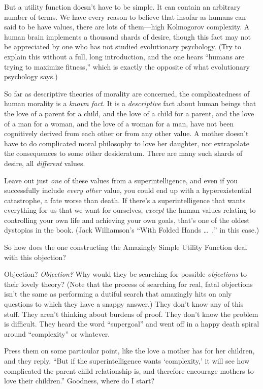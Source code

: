 {
 But a utility function doesn't have to be simple.
It can contain an arbitrary number of terms. We have every reason to
believe that insofar as humans can said to be have values, there are
lots of them---high Kolmogorov complexity. A human brain implements a
thousand shards of desire, though this fact may not be appreciated by
one who has not studied evolutionary psychology. (Try to explain this
without a full, long introduction, and the one hears
``humans are trying to maximize
fitness,'' which is exactly the opposite of what
evolutionary psychology says.)}

{
 So far as descriptive theories of morality are concerned, the
complicatedness of human morality is a \textit{known fact}. It is a
\textit{descriptive} fact about human beings that the love of a parent
for a child, and the love of a child for a parent, and the love of a
man for a woman, and the love of a woman for a man, have not been
cognitively derived from each other or from any other value. A mother
doesn't have to do complicated moral philosophy to love
her daughter, nor extrapolate the consequences to some other
desideratum. There are many such shards of desire, all
\textit{different} values.}

{
 Leave out just \textit{one} of these values from a
superintelligence, and even if you successfully include \textit{every
other} value, you could end up with a hyperexistential catastrophe, a
fate worse than death. If there's a superintelligence
that wants everything for us that we want for ourselves,
\textit{except} the human values relating to controlling your own life
and achieving your own goals, that's one of the oldest
dystopias in the book. (Jack Williamson's
``With Folded Hands \ldots~,'' in
this case.)}

{
 So how does the one constructing the Amazingly Simple Utility
Function deal with this objection?}

{
 Objection? \textit{Objection?} Why would they be searching for
possible \textit{objections} to their lovely theory? (Note that the
process of searching for real, fatal objections isn't
the same as performing a dutiful search that amazingly hits on only
questions to which they have a snappy answer.) They
don't know any of this stuff. They
aren't thinking about burdens of proof. They
don't know the problem is difficult. They heard the
word ``supergoal'' and went off in a
happy death spiral around
``complexity'' or whatever.}

{
 Press them on some particular point, like the love a mother has
for her children, and they reply, ``But if the
superintelligence wants `complexity,' it
will see how complicated the parent-child relationship is, and
therefore encourage mothers to love their children.''
Goodness, where do I start?}


